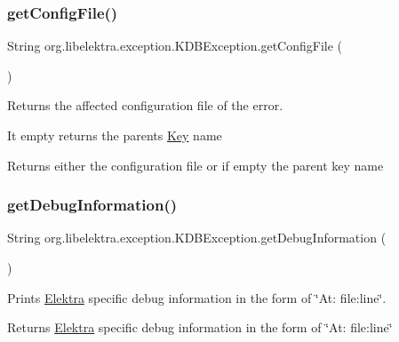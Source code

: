 \subsubsection{\texorpdfstring{getConfigFile()}{getConfigFile()}}
{\footnotesize\ttfamily String org.\+libelektra.\+exception.\+K\+D\+B\+Exception.\+get\+Config\+File (\begin{DoxyParamCaption}{ }\end{DoxyParamCaption})\hspace{0.3cm}{\ttfamily [inline]}}



Returns the affected configuration file of the error. 

It empty returns the parents \mbox{\hyperlink{classorg_1_1libelektra_1_1Key}{Key}} name

\begin{DoxyReturn}{Returns}
either the configuration file or if empty the parent key name 
\end{DoxyReturn}
\mbox{\label{classorg_1_1libelektra_1_1exception_1_1KDBException_ad43f4032095b1bfa1dc5065c5e01f9bb}} 
\subsubsection{\texorpdfstring{getDebugInformation()}{getDebugInformation()}}
{\footnotesize\ttfamily String org.\+libelektra.\+exception.\+K\+D\+B\+Exception.\+get\+Debug\+Information (\begin{DoxyParamCaption}{ }\end{DoxyParamCaption})\hspace{0.3cm}{\ttfamily [inline]}}



Prints \mbox{\hyperlink{interfaceorg_1_1libelektra_1_1Elektra}{Elektra}} specific debug information in the form of \char`\"{}\+At\+: file\+:line\char`\"{}. 

\begin{DoxyReturn}{Returns}
\mbox{\hyperlink{interfaceorg_1_1libelektra_1_1Elektra}{Elektra}} specific debug information in the form of \char`\"{}\+At\+: file\+:line\char`\"{} 
\end{DoxyReturn}
\mbox{\label{classorg_1_1libelektra_1_1exception_1_1KDBException_a8fd8c0decfe1f1f6243407614d042101}} 
